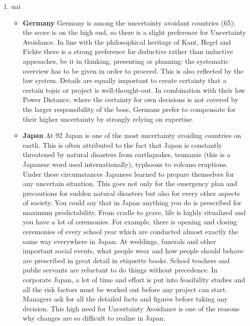 \begin{enumerate}
    \item \ac{uai}
    \begin{itemize}
        \item \textbf{Germany}
        Germany is among the uncertainty avoidant countries (65); the score is on the high end, so there is a slight preference for Uncertainty Avoidance.
        In line with the philosophical heritage of Kant, Hegel and Fichte there is a strong preference for deductive rather than inductive approaches, be it in thinking, presenting or planning: the systematic overview has to be given in order to proceed.
        This is also reflected by the law system.
        Details are equally important to create certainty that a certain topic or project is well-thought-out.
        In combination with their low Power Distance, where the certainty for own decisions is not covered by the larger responsibility of the boss, Germans prefer to compensate for their higher uncertainty by strongly relying on expertise.

        \item \textbf{Japan}
        At 92 Japan is one of the most uncertainty avoiding countries on earth.
        This is often attributed to the fact that Japan is constantly threatened by natural disasters from earthquakes, tsunamis (this is a Japanese word used internationally), typhoons to volcano eruptions.
        Under these circumstances Japanese learned to prepare themselves for any uncertain situation.
        This goes not only for the emergency plan and precautions for sudden natural disasters but also for every other aspects of society.
        You could say that in Japan anything you do is prescribed for maximum predictability.
        From cradle to grave, life is highly ritualized and you have a lot of ceremonies.
        For example, there is opening and closing ceremonies of every school year which are conducted almost exactly the same way everywhere in Japan.
        At weddings, funerals and other important social events, what people wear and how people should behave are prescribed in great detail in etiquette books.
        School teachers and public servants are reluctant to do things without precedence.
        In corporate Japan, a lot of time and effort is put into feasibility studies and all the risk factors must be worked out before any project can start.
        Managers ask for all the detailed facts and figures before taking any decision.
        This high need for Uncertainty Avoidance is one of the reasons why changes are so difficult to realize in Japan.
    \end{itemize}


\end{enumerate}
